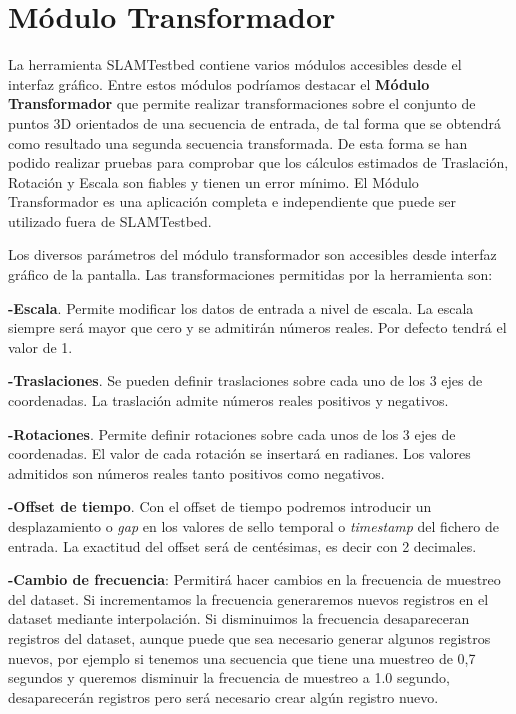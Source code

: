  
\section{Módulo Transformador}
La herramienta SLAMTestbed contiene varios módulos accesibles desde el interfaz gráfico. Entre estos módulos podríamos destacar el \textbf{Módulo Transformador} que permite
realizar transformaciones sobre el conjunto de puntos 3D orientados de una secuencia de entrada, de tal forma que se obtendrá como resultado una segunda secuencia transformada. De esta forma se han podido realizar pruebas para comprobar que los cálculos estimados de Traslación, Rotación y Escala son fiables y tienen un error mínimo.
El Módulo Transformador es una aplicación completa e independiente que  puede ser utilizado fuera de SLAMTestbed. 

Los diversos parámetros del módulo transformador son accesibles desde interfaz gráfico de la pantalla. Las transformaciones permitidas por la herramienta son:

\textbf{-Escala}. Permite modificar los datos de entrada a nivel de escala. La escala siempre será mayor que cero y se admitirán números reales. Por defecto tendrá el valor de 1. 

\textbf{-Traslaciones}. Se pueden definir traslaciones sobre cada uno de los 3 ejes de coordenadas. La traslación admite números reales positivos y negativos.

\textbf{-Rotaciones}. Permite definir rotaciones sobre cada unos de los 3 ejes de coordenadas. El valor de cada rotación se insertará en radianes. Los valores admitidos son números reales tanto positivos como negativos. 

\textbf{-Offset de tiempo}. Con el offset de tiempo podremos introducir un desplazamiento o \textit{gap} en los valores de sello temporal o \textit{timestamp} del fichero de entrada. La exactitud del offset será de centésimas, es decir con 2 decimales.

\textbf{-Cambio de frecuencia}: Permitirá hacer cambios en la frecuencia de muestreo del dataset. Si incrementamos la frecuencia generaremos nuevos registros en el dataset mediante interpolación. Si disminuimos la frecuencia desapareceran registros del dataset, aunque puede que sea necesario generar algunos registros nuevos, por ejemplo si tenemos una secuencia que tiene una muestreo de 0,7 segundos y queremos disminuir la frecuencia de muestreo a 1.0 segundo, desaparecerán registros pero será necesario crear algún registro nuevo.

